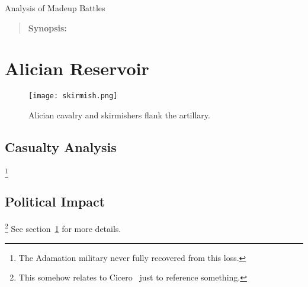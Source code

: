 




\begin{center}\begin{Large}
	Analysis of Madeup Battles
\end{Large}\end{center}

\begin{quotation}
	\noindent \textbf{Synopsis:} \small\lipsum[1]
\end{quotation}




\section{Alician Reservoir}
\label{sec:alician-reservoir}
%
\lipsum[2]

\begin{figure}[h]
	\centering
	\texttt{[image: skirmish.png]}
	\caption{Alician cavalry and skirmishers flank the artillary.}
\end{figure}


\subsection{Casualty Analysis}
\label{subsec:casualty-analysis}
%
\lipsum[3]\footnote{The Adamation military never fully recovered from this loss.}


\subsection{Political Impact}
\label{subsec:political-impact}
%
\lipsum[4]\footnote{This somehow relates to Cicero~\cite{clayton-introduction} just to reference something.} See section~\ref{sec:alician-reservoir} for more details.









